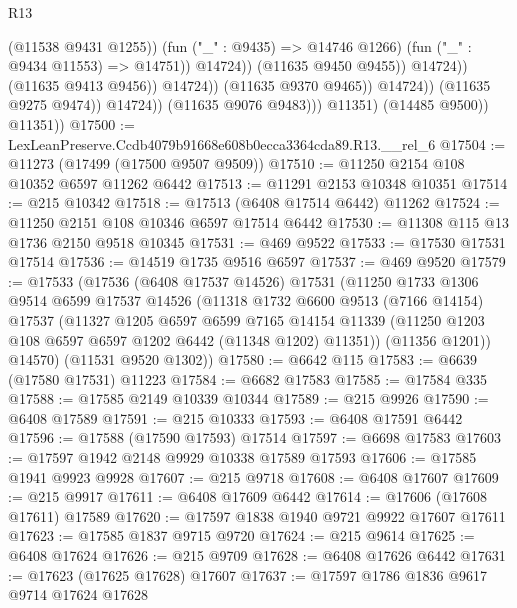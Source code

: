 \begin{lexlean}{R13}
\begin{coremodule}
                                                (@11538 @9431 @1255))
                                              (fun ("_" : @9435) => @14746 @1266)
                                              (fun ("_" : @9434 @11553) => @14751))
                                            @14724))
                                        (@11635 @9450 @9455))
                                      @14724))
                                  (@11635 @9413 @9456))
                                @14724))
                            (@11635 @9370 @9465))
                          @14724))
                      (@11635 @9275 @9474))
                    @14724))
                (@11635 @9076 @9483)))
            @11351)
          (@14485 @9500))
        @11351))
@17500 := LexLeanPreserve.Ccdb4079b91668e608b0ecca3364cda89.R13.__rel_6
@17504 := @11273 (@17499 (@17500 @9507 @9509))
@17510 := @11250 @2154 @108 @10352 @6597 @11262 @6442
@17513 := @11291 @2153 @10348 @10351
@17514 := @215 @10342
@17518 := @17513 (@6408 @17514 @6442) @11262
@17524 := @11250 @2151 @108 @10346 @6597 @17514 @6442
@17530 := @11308 @115 @13 @1736 @2150 @9518 @10345
@17531 := @469 @9522
@17533 := @17530 @17531 @17514
@17536 := @14519 @1735 @9516 @6597
@17537 := @469 @9520
@17579 := @17533
    (@17536
      (@6408 @17537 @14526)
      @17531
      (@11250
        @1733
        @1306
        @9514
        @6599
        @17537
        @14526
        (@11318
          @1732
          @6600
          @9513
          (@7166 @14154)
          @17537
          (@11327
            @1205
            @6597
            @6599
            @7165
            @14154
            @11339
            (@11250 @1203 @108 @6597 @6597 @1202 @6442 (@11348 @1202) @11351))
          (@11356 @1201))
        @14570)
      (@11531 @9520 @1302))
@17580 := @6642 @115
@17583 := @6639 (@17580 @17531) @11223
@17584 := @6682 @17583
@17585 := @17584 @335
@17588 := @17585 @2149 @10339 @10344
@17589 := @215 @9926
@17590 := @6408 @17589
@17591 := @215 @10333
@17593 := @6408 @17591 @6442
@17596 := @17588 (@17590 @17593) @17514
@17597 := @6698 @17583
@17603 := @17597 @1942 @2148 @9929 @10338 @17589 @17593
@17606 := @17585 @1941 @9923 @9928
@17607 := @215 @9718
@17608 := @6408 @17607
@17609 := @215 @9917
@17611 := @6408 @17609 @6442
@17614 := @17606 (@17608 @17611) @17589
@17620 := @17597 @1838 @1940 @9721 @9922 @17607 @17611
@17623 := @17585 @1837 @9715 @9720
@17624 := @215 @9614
@17625 := @6408 @17624
@17626 := @215 @9709
@17628 := @6408 @17626 @6442
@17631 := @17623 (@17625 @17628) @17607
@17637 := @17597 @1786 @1836 @9617 @9714 @17624 @17628

\end{coremodule}
\end{lexlean}
